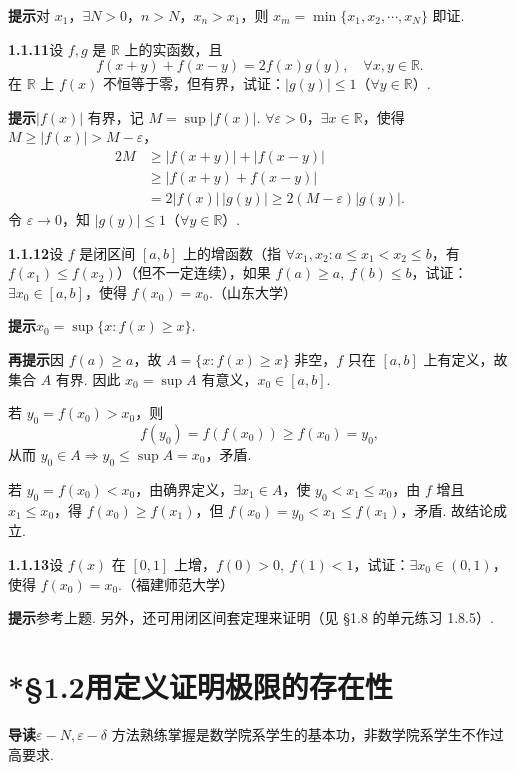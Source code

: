 \documentclass[UTF8,12pt,a4paper,fontset=fandol]{ctexart}
\begin{document}
\noindent\textbf{提示}\quad 对 $x_1$，$\exists N>0$，$n>N$，$x_n>x_1$，则 $x_m=\min\{x_1,x_2,\cdots,x_N\}$ 即证.

\noindent\textbf{1.1.11}\quad 设 $f,g$ 是 $\mathbb{R}$ 上的实函数，且
\[
  f(x+y)+f(x-y)=2f(x)g(y),\quad \forall x,y\in\mathbb{R}.
\]
在 $\mathbb{R}$ 上 $f(x)$ 不恒等于零，但有界，试证：$|g(y)|\le1$（$\forall y\in\mathbb{R}$）.

\noindent\textbf{提示}\quad $|f(x)|$ 有界，记 $M=\sup|f(x)|$. $\forall\varepsilon>0$，$\exists x\in\mathbb{R}$，使得 $M\ge |f(x)|>M-\varepsilon$，
\[
\begin{aligned}
2M&\ge |f(x+y)|+|f(x-y)|\\
&\ge |f(x+y)+f(x-y)|\\
&=2|f(x)|\,|g(y)|\ge 2(M-\varepsilon)|g(y)|.
\end{aligned}
\]
令 $\varepsilon\to0$，知 $|g(y)|\le1$（$\forall y\in\mathbb{R}$）.

\noindent\textbf{1.1.12}\quad 设 $f$ 是闭区间 $[a,b]$ 上的增函数（指 $\forall x_1,x_2:a\le x_1<x_2\le b$，有 $f(x_1)\le f(x_2)$）（但不一定连续），如果 $f(a)\ge a,\ f(b)\le b$，试证：$\exists x_0\in[a,b]$，使得 $f(x_0)=x_0$.（山东大学）

\noindent\textbf{提示}\quad $x_0=\sup\{x:f(x)\ge x\}$.

\noindent\textbf{再提示}\quad 因 $f(a)\ge a$，故 $A=\{x:f(x)\ge x\}$ 非空，$f$ 只在 $[a,b]$ 上有定义，故集合 $A$ 有界. 因此 $x_0=\sup A$ 有意义，$x_0\in[a,b]$.

若 $y_0=f(x_0)>x_0$，则
\[
  f(y_0)=f(f(x_0))\ge f(x_0)=y_0,
\]
从而 $y_0\in A\Rightarrow y_0\le\sup A=x_0$，矛盾.

若 $y_0=f(x_0)<x_0$，由确界定义，$\exists x_1\in A$，使 $y_0<x_1\le x_0$，由 $f$ 增且 $x_1\le x_0$，得 $f(x_0)\ge f(x_1)$，但 $f(x_0)=y_0<x_1\le f(x_1)$，矛盾. 故结论成立.

\noindent\textbf{1.1.13}\quad 设 $f(x)$ 在 $[0,1]$ 上增，$f(0)>0,\ f(1)<1$，试证：$\exists x_0\in(0,1)$，使得 $f(x_0)=x_0$.（福建师范大学）

\noindent\textbf{提示}\quad 参考上题. 另外，还可用闭区间套定理来证明（见 §1.8 的单元练习 1.8.5）.

\section*{*§1.2\quad 用定义证明极限的存在性}

\noindent\textbf{导读}\quad $\varepsilon-N,\varepsilon-\delta$ 方法熟练掌握是数学院系学生的基本功，非数学院系学生不作过高要求.
\end{document}
